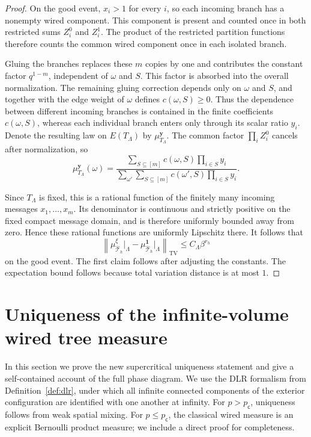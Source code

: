 \documentclass[11pt]{amsart}
\theoremstyle{plain}
\theoremstyle{definition}
\theoremstyle{remark}
\newcommand{\dreg}{\widehat {\mathcal T}_h}
\newcommand{\pc}{p_{\mathsf{c}}}
\begin{document}
\begin{proof}
On the good event, $x_i>1$ for every $i$, so each incoming branch has a nonempty wired component. This component is present and counted once in both restricted sums $Z_i^0$ and $Z_i^1$. The product of the restricted partition functions therefore counts the common wired component once in each isolated branch. 

Gluing the branches replaces these $m$ copies by one and contributes the constant factor $q^{1-m}$, independent of $\omega$ and $S$. This factor is absorbed into the overall normalization. The remaining gluing correction depends only on $\omega$ and $S$, and together with the edge weight of $\omega$ defines $c(\omega,S)\ge0$. Thus the dependence between different incoming branches is contained in the finite coefficients $c(\omega,S)$, whereas each individual branch enters only through its scalar ratio $y_i$. Denote the resulting law on $E(T_\Lambda)$ by $\mu_{T_\Lambda}^{\mathbf y}$. The common factor $\prod_i Z_i^0$ cancels after normalization, so
\[
    \mu_{T_\Lambda}^{\mathbf y}(\omega)
    =
    \frac{
        \displaystyle
        \sum_{S\subseteq[m]}
        c(\omega,S)
        \prod_{i\in S}y_i
    }{
        \displaystyle
        \sum_{\omega'}
        \sum_{S\subseteq[m]}
        c(\omega',S)
        \prod_{i\in S}y_i
    }.
\]

Since $T_\Lambda$ is fixed, this is a rational function of the finitely many incoming messages $x_1,\ldots,x_m$. Its denominator is continuous and strictly positive on the fixed compact message domain, and is therefore uniformly bounded away from zero. Hence these rational functions are uniformly Lipschitz there. It follows that
\[
    \left\|
        \mu_{\dreg}^{\xi}\vert_\Lambda
        -
        \mu_{\dreg}^{\mathbf 1}\vert_\Lambda
    \right\|_{\mathrm{TV}}
    \le
    C_\Lambda\beta^{r_h}
\]
on the good event. The first claim follows after adjusting the constants. The expectation bound follows because total variation distance is at most $1$.
\end{proof}


\section{Uniqueness of the infinite-volume wired tree measure}
\label{sec:uniqueness}

In this section we prove the new supercritical uniqueness statement and give a self-contained account of the full phase diagram. We use the DLR formalism from Definition~\ref{def:dlr}, under which all infinite connected components of the exterior configuration are identified with one another at infinity. For $p>\pc$, uniqueness follows from weak spatial mixing. For $p\le\pc$, the classical wired measure is an explicit Bernoulli product measure; we include a direct proof for completeness.
\end{document}
